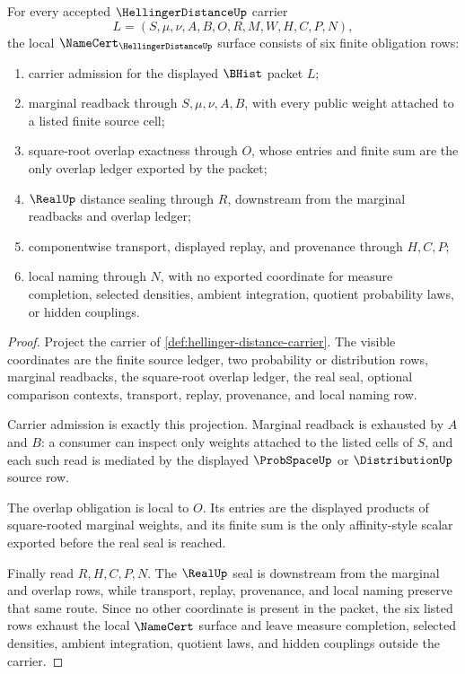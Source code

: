 \begin{theorem}
\label{thm:hellinger-distance-namecert-obligations}
For every accepted $\HellingerDistanceUp$ carrier
$$
L=(S,\mu,\nu,A,B,O,R,M,W,H,C,P,N),
$$
the local $\NameCert_{\HellingerDistanceUp}$ surface consists of six finite obligation rows:
\begin{enumerate}
\item carrier admission for the displayed $\BHist$ packet $L$;
\item marginal readback through $S,\mu,\nu,A,B$, with every public weight attached to a listed finite source cell;
\item square-root overlap exactness through $O$, whose entries and finite sum are the only overlap ledger exported by the packet;
\item $\RealUp$ distance sealing through $R$, downstream from the marginal readbacks and overlap ledger;
\item componentwise transport, displayed replay, and provenance through $H,C,P$;
\item local naming through $N$, with no exported coordinate for measure completion, selected densities, ambient integration, quotient probability laws, or hidden couplings.
\end{enumerate}
\end{theorem}
\begin{proof}
Project the carrier of \autoref{def:hellinger-distance-carrier}. The visible coordinates are the finite source ledger, two probability or distribution rows, marginal readbacks, the square-root overlap ledger, the real seal, optional comparison contexts, transport, replay, provenance, and local naming row.

Carrier admission is exactly this projection. Marginal readback is exhausted by $A$ and $B$: a consumer can inspect only weights attached to the listed cells of $S$, and each such read is mediated by the displayed $\ProbSpaceUp$ or $\DistributionUp$ source row.

The overlap obligation is local to $O$. Its entries are the displayed products of square-rooted marginal weights, and its finite sum is the only affinity-style scalar exported before the real seal is reached.

Finally read $R,H,C,P,N$. The $\RealUp$ seal is downstream from the marginal and overlap rows, while transport, replay, provenance, and local naming preserve that same route. Since no other coordinate is present in the packet, the six listed rows exhaust the local $\NameCert$ surface and leave measure completion, selected densities, ambient integration, quotient laws, and hidden couplings outside the carrier.
\end{proof}

